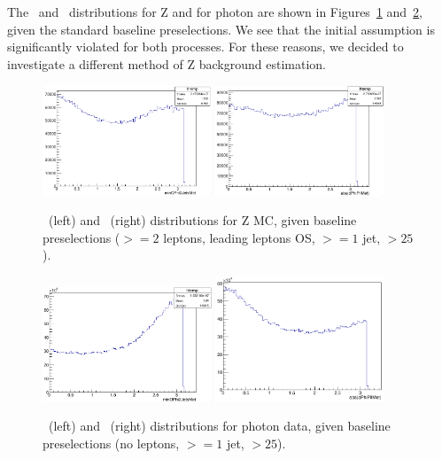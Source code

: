 The \mindphijm\ and \dphiptllmet\ distributions for Z and for photon are shown in Figures~\ref{fig:Z_distributions} and~\ref{fig:photon_distributions}, given the standard baseline preselections. We see that the initial assumption is significantly violated for both processes. For these reasons, we decided to investigate a different method of Z background estimation.

\begin{figure}[hbtp]
    \centering
    \includegraphics[width=0.45\textwidth]{Images/SUSY/Z_dphijm.png}
    \includegraphics[width=0.45\textwidth]{Images/SUSY/Z_dphipm.png}
    \caption{\mindphijm\ (left) and \dphiptllmet\ (right) distributions for Z MC, given baseline preselections ($>=2$ leptons, leading leptons OS, $>=1$ jet, \ptll$>25$).}
    \label{fig:Z_distributions}
\end{figure}

\begin{figure}[hbtp]
    \centering
    \includegraphics[width=0.45\textwidth]{Images/SUSY/photon_dphijm.png}
    \includegraphics[width=0.45\textwidth]{Images/SUSY/photon_dphipm.png}
    \caption{\mindphijm\ (left) and \dphiptllmet\ (right) distributions for photon data, given baseline preselections (no leptons, $>=1$ jet, \ptll$>25$).}
    \label{fig:photon_distributions}
\end{figure}

